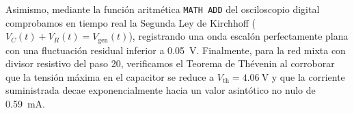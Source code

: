 Asimismo, mediante la función aritmética \texttt{MATH ADD} del osciloscopio digital comprobamos en tiempo real la Segunda Ley de Kirchhoff ($V_C(t) + V_R(t) = V_{\text{gen}}(t)$), registrando una onda escalón perfectamente plana con una fluctuación residual inferior a \qty{0,05}{\volt}. Finalmente, para la red mixta con divisor resistivo del paso 20, verificamos el Teorema de Thévenin al corroborar que la tensión máxima en el capacitor se reduce a $V_{\text{th}} = \qty{4,06}{\volt}$ y que la corriente suministrada decae exponencialmente hacia un valor asintótico no nulo de \qty{0,59}{\milli\ampere}.
